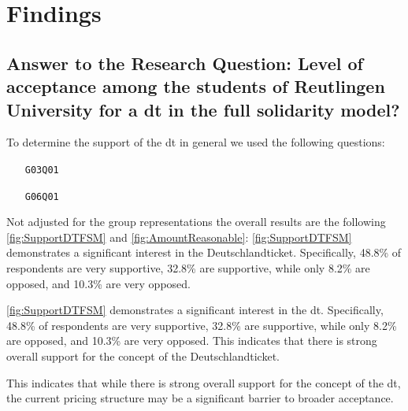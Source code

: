 \pagebreak
\section{Findings}
\subsection{Answer to the Research Question: Level of acceptance among the students of Reutlingen University for a \gls{dt} in the full solidarity model?}
\begin{center}
\end{center}

To determine the support of the \gls{dt} in general we used the following questions:

\begin{enumerate}
    \item[\texttt{G03Q01}] 
    \item[\texttt{G06Q01}] 
\end{enumerate}

Not adjusted for the group representations the overall results are the following \ref{fig:SupportDTFSM} and \ref{fig:AmountReasonable}:
\ref{fig:SupportDTFSM} demonstrates a significant interest in the Deutschlandticket. Specifically, 48.8\% of respondents are very supportive, 32.8\% are supportive, while only 8.2\% are opposed, and 10.3\% are very opposed.

\ref{fig:SupportDTFSM} demonstrates a significant interest in the \gls{dt}. Specifically, 48.8\% of respondents are very supportive, 32.8\% are supportive, while only 8.2\% are opposed, and 10.3\% are very opposed. This indicates that there is strong overall support for the concept of the Deutschlandticket.

This indicates that while there is strong overall support for the concept of the \gls{dt}, the current pricing structure may be a significant barrier to broader acceptance.

\begin{multicols}{2}
    {
        
    } \columnbreak {
        
    }
\end{multicols}

